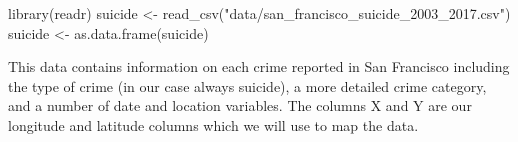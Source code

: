 \documentclass[
]{krantz}
\makeatletter
\newenvironment{Shaded}{\begin{snugshade}}{\end{snugshade}}
\newcommand{\FunctionTok}[1]{\textcolor[rgb]{0,0,0}{#1}}
\newcommand{\NormalTok}[1]{#1}
\newcommand{\OtherTok}[1]{\textcolor[rgb]{0.37,0.37,0.37}{#1}}
\newcommand{\StringTok}[1]{\textcolor[rgb]{0.5,0.5,0.5}{#1}}
\newenvironment{kframe}{%
\medskip{}
\setlength{\fboxsep}{.8em}
 \def\at@end@of@kframe{}%
 \ifinner\ifhmode%
  \def\at@end@of@kframe{\end{minipage}}%
  \begin{minipage}{\columnwidth}%
 \fi\fi%
 \def\FrameCommand##1{\hskip\@totalleftmargin \hskip-\fboxsep
 \colorbox{shadecolor}{##1}\hskip-\fboxsep
     \hskip-\linewidth \hskip-\@totalleftmargin \hskip\columnwidth}%
 \MakeFramed {\advance\hsize-\width
   \@totalleftmargin\z@ \linewidth\hsize
   \@setminipage}}%
 {\par\unskip\endMakeFramed%
 \at@end@of@kframe}
\renewenvironment{Shaded}{\begin{kframe}}{\end{kframe}}
\makeatother
\begin{document}
\begin{Shaded}
\begin{Highlighting}[]
\FunctionTok{library}\NormalTok{(readr)}
\NormalTok{suicide }\OtherTok{\textless{}{-}} \FunctionTok{read\_csv}\NormalTok{(}\StringTok{"data/san\_francisco\_suicide\_2003\_2017.csv"}\NormalTok{)}
\NormalTok{suicide }\OtherTok{\textless{}{-}} \FunctionTok{as.data.frame}\NormalTok{(suicide)}
\end{Highlighting}
\end{Shaded}

This data contains information on each crime reported in San
Francisco including the type of crime (in our case always
suicide), a more detailed crime category, and a number of
date and location variables. The columns X and Y are our
longitude and latitude columns which we will use to map the
data.
\end{document}
